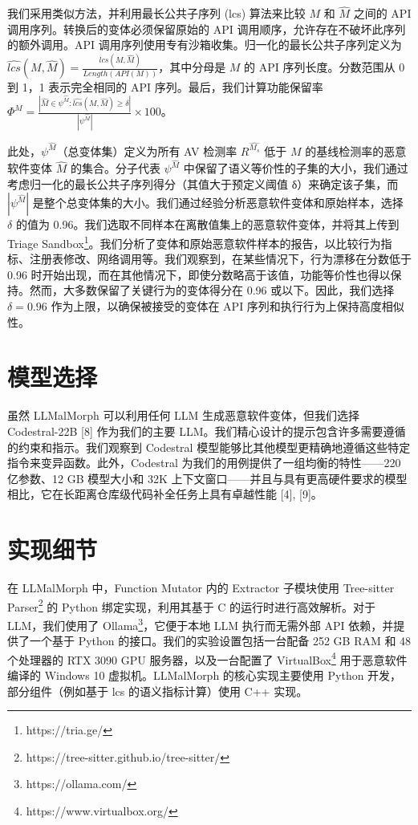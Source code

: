 我们采用类似方法，并利用最长公共子序列 (lcs) 算法来比较 $M$ 和 $\hat{M}$ 之间的 API 调用序列。转换后的变体必须保留原始的 API 调用顺序，允许存在不破坏此序列的额外调用。API 调用序列使用专有沙箱收集。归一化的最长公共子序列定义为 $\hat{lcs}(M, \hat{M})= \frac{lcs(M, \hat{M})}{Length(API(M))}$，其中分母是 $M$ 的 API 序列长度。分数范围从 0 到 1，1 表示完全相同的 API 序列。最后，我们计算功能保留率 $\Phi^{M} = \frac{|\hat{M} \in \psi^{\hat{M}}:\hat{lcs}(M,\hat{M}) \geq \delta|}{|\psi^{\hat{M}}|} \times 100$。

此处，$\psi^{\hat{M}}$（总变体集）定义为所有 AV 检测率 $R^{\hat{M_{s}}}$ 低于 $M$ 的基线检测率的恶意软件变体 $\hat{M}$ 的集合。分子代表 $\psi^{\hat{M}}$ 中保留了语义等价性的子集的大小，我们通过考虑归一化的最长公共子序列得分（其值大于预定义阈值 δ）来确定该子集，而 $|\psi^{\hat{M}}|$ 是整个总变体集的大小。我们通过经验分析恶意软件变体和原始样本，选择 $\delta$ 的值为 0.96。我们选取不同样本在离散值集上的恶意软件变体，并将其上传到 Triage Sandbox\footnote{https://tria.ge/}。我们分析了变体和原始恶意软件样本的报告，以比较行为指标、注册表修改、网络调用等。我们观察到，在某些情况下，行为漂移在分数低于 0.96 时开始出现，而在其他情况下，即使分数略高于该值，功能等价性也得以保持。然而，大多数保留了关键行为的变体得分在 0.96 或以下。因此，我们选择 $\delta = 0.96$ 作为上限，以确保被接受的变体在 API 序列和执行行为上保持高度相似性。

\section{模型选择}
虽然 LLMalMorph 可以利用任何 LLM 生成恶意软件变体，但我们选择 Codestral-22B [8] 作为我们的主要 LLM。我们精心设计的提示包含许多需要遵循的约束和指示。我们观察到 Codestral 模型能够比其他模型更精确地遵循这些特定指令来变异函数。此外，Codestral 为我们的用例提供了一组均衡的特性——220 亿参数、12 GB 模型大小和 32K 上下文窗口——并且与具有更高硬件要求的模型相比，它在长距离仓库级代码补全任务上具有卓越性能 [4], [9]。

\section{实现细节}
在 LLMalMorph 中，Function Mutator 内的 Extractor 子模块使用 Tree-sitter Parser\footnote{https://tree-sitter.github.io/tree-sitter/} 的 Python 绑定实现，利用其基于 C 的运行时进行高效解析。对于 LLM，我们使用了 Ollama\footnote{https://ollama.com/}，它便于本地 LLM 执行而无需外部 API 依赖，并提供了一个基于 Python 的接口。我们的实验设置包括一台配备 252 GB RAM 和 48 个处理器的 RTX 3090 GPU 服务器，以及一台配置了 VirtualBox\footnote{https://www.virtualbox.org/} 用于恶意软件编译的 Windows 10 虚拟机。LLMalMorph 的核心实现主要使用 Python 开发，部分组件（例如基于 lcs 的语义指标计算）使用 C++ 实现。

